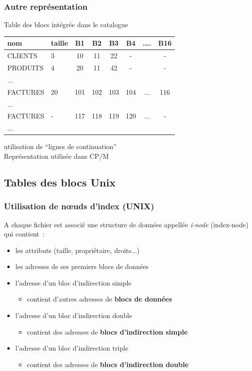 \begin{frame}
\frametitle{Autre représentation}
\alert{Table des blocs} intégrée dans le catalogue

\begin{tabular}{|l|l|cccccc|}
\hline
nom & taille & B1 & B2 & B3 & B4 & .... &B16 \\
\hline
CLIENTS & 3 & 10 & 11 & 22 & - & & -\\ PRODUITS & 4 & 20 & 11 & 42 & - & & -\\
...&&&&&&& \\ FACTURES & 20 & 101 & 102 & 103 & 104 & ... & 116 \\ ...&&&&&&& \\
FACTURES & - & 117 & 118 & 119 & 120 & ... & - \\ ...&&&&&&& \\
\hline
\end{tabular}
 utilisation de ``lignes de continuation''\\
\vspace{0.5cm}
Représentation utilisée dans CP/M
\end{frame}

\subsection{Tables des blocs Unix}

\begin{frame}
\frametitle{Utilisation de n\oe{}uds d'index (UNIX)}

A chaque fichier est associé une \alert{structure de données} appellée
\alert{\emph{i-node}} (index-node) qui contient~:
\begin{itemize}
\item les attributs (taille, propriétaire, droits...)
\item les adresses de ses premiers blocs de données
\pause
\item l'adresse d'un \alert{bloc d'indirection simple} 
\begin{itemize}
\item contient d'autres adresses de \textbf{blocs de données}
\end{itemize}
\pause
\item l'adresse d'un \alert{bloc d'indirection double}
\begin{itemize}
\item contient des adresses de \textbf{blocs d'indirection simple}
\end{itemize}
\pause
\item l'adresse d'un \alert{bloc d'indirection triple}
\begin{itemize}
\item contient des adresses de \textbf{blocs d'indirection double}
\end{itemize}
\end{itemize}
\end{frame}

